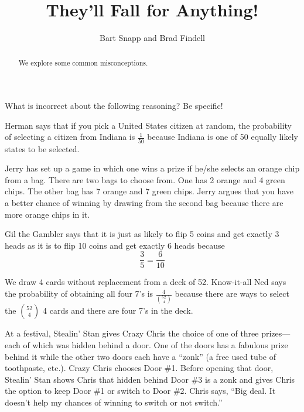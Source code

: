\documentclass[nooutcomes]{ximera}
\title{They'll Fall for Anything!}
\author{Bart Snapp and Brad Findell}
\begin{document}
\begin{abstract}
  We explore some common misconceptions.
\end{abstract}
\maketitle

\label{A:fallForAnything}

What is incorrect about the following reasoning? Be specific!

\begin{problem}
Herman says that if you pick a United States citizen at random, the
probability of selecting a citizen from Indiana is $\frac{1}{50}$ because Indiana is
one of 50 equally likely states to be selected.
\end{problem}


\begin{problem}
Jerry has set up a game in which one wins a prize if he/she selects an
orange chip from a bag.  There are two bags to choose from.  One has 2
orange and 4 green chips.  The other bag has 7 orange and 7 green
chips.  Jerry argues that you have a better chance of winning by
drawing from the second bag because there are more orange chips in it.
\end{problem}

\begin{problem}
Gil the Gambler says that it is just as likely to flip 5 coins and get
exactly 3 heads as it is to flip 10 coins and get exactly 6 heads
because
\[
\frac{3}{5} = \frac{6}{10}
\]
\end{problem}

\begin{problem}
We draw 4 cards without replacement from a deck of 52.  Know-it-all
Ned says the probability of obtaining all four 7's is
$\frac{4}{\binom{52}{4}}$ because there are ways to select the
$\binom{52}{4}$ 4 cards and there are four 7's in the deck.
\end{problem} 

\begin{problem}
At a festival, Stealin' Stan gives Crazy Chris the choice of one of
three prizes---each of which was hidden behind a door.  One of the
doors has a fabulous prize behind it while the other two doors each
have a ``zonk'' (a free used tube of toothpaste, etc.).  Crazy Chris
chooses Door \#1.  Before opening that door, Stealin' Stan shows Chris
that hidden behind Door \#3 is a zonk and gives Chris the option to
keep Door \#1 or switch to Door \#2.  Chris says, ``Big deal.  It doesn't
help my chances of winning to switch or not switch.''
\end{problem}
\end{document}
